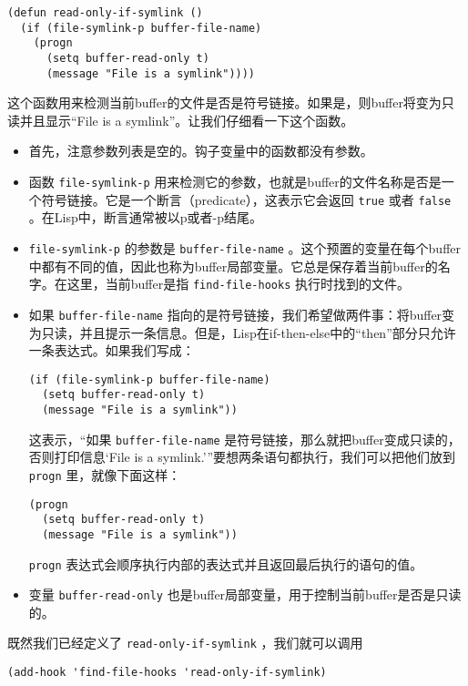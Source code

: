 \begin{verbatim}
(defun read-only-if-symlink ()
  (if (file-symlink-p buffer-file-name)
    (progn
      (setq buffer-read-only t)
      (message "File is a symlink"))))
\end{verbatim}

这个函数用来检测当前buffer的文件是否是符号链接。如果是，则buffer将变为只读并且显示“File is a symlink”。让我们仔细看一下这个函数。

\begin{itemize}
  \item 首先，注意参数列表是空的。钩子变量中的函数都没有参数。
  \item 函数 \texttt{file-symlink-p} 用来检测它的参数，也就是buffer的文件名称是否是一个符号链接。它是一个断言（predicate），这表示它会返回 \texttt{true} 或者 \texttt{false} 。在Lisp中，断言通常被以p或者-p结尾。
  \item \texttt{file-symlink-p} 的参数是 \texttt{buffer-file-name} 。这个预置的变量在每个buffer中都有不同的值，因此也称为buffer局部变量。它总是保存着当前buffer的名字。在这里，当前buffer是指 \texttt{find-file-hooks} 执行时找到的文件。
  \item 如果 \texttt{buffer-file-name} 指向的是符号链接，我们希望做两件事：将buffer变为只读，并且提示一条信息。但是，Lisp在if-then-else中的“then”部分只允许一条表达式。如果我们写成：
\begin{verbatim}
(if (file-symlink-p buffer-file-name)
  (setq buffer-read-only t)
  (message "File is a symlink"))
\end{verbatim}
这表示，“如果 \texttt{buffer-file-name} 是符号链接，那么就把buffer变成只读的，否则打印信息‘File is a symlink.’”要想两条语句都执行，我们可以把他们放到 \texttt{progn} 里，就像下面这样：
\begin{verbatim}
(progn
  (setq buffer-read-only t)
  (message "File is a symlink"))
\end{verbatim}
 \texttt{progn} 表达式会顺序执行内部的表达式并且返回最后执行的语句的值。
  \item 变量 \texttt{buffer-read-only} 也是buffer局部变量，用于控制当前buffer是否是只读的。
\end{itemize}

既然我们已经定义了 \texttt{read-only-if-symlink} ，我们就可以调用

\begin{verbatim}
(add-hook 'find-file-hooks 'read-only-if-symlink)
\end{verbatim}

